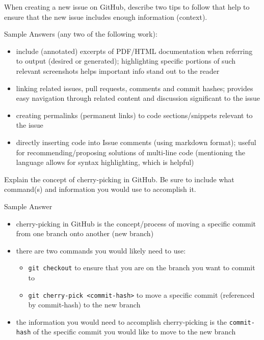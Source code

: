 \documentclass[12pt,fleqn]{examtst}
\begin{document}

\newpage
\noindent
\begin{minipage}{\textwidth}

When creating a new issue on GitHub, describe two tips to follow that help to ensure that the new issue includes enough information (context).


Sample Answers (any two of the following work):
\begin{itemize}
    \item include (annotated) excerpts of PDF/HTML documentation when referring to output (desired or generated); highlighting specific portions of such relevant screenshots helps important info stand out to the reader
    \item linking related issues, pull requests, comments and commit hashes; provides easy navigation through related content and discussion significant to the issue
    \item creating permalinks (permanent links) to code sections/snippets relevant to the issue
    \item directly inserting code into Issue comments (using markdown format); useful for recommending/proposing solutions of multi-line code (mentioning the language allows for syntax highlighting, which is helpful)
\end{itemize}

\rule{0cm}{1cm}

Explain the concept of cherry-picking in GitHub. Be sure to include what command(s) and information you would use to accomplish it.


Sample Answer
\begin{itemize}
    \item cherry-picking in GitHub is the concept/process of moving a specific commit from one branch onto another (new branch)
    \item there are two commands you would likely need to use:
    \begin{itemize}
        \item \lstinline{git checkout} to ensure that you are on the branch you want to commit to
        \item \lstinline{git cherry-pick <commit-hash>} to move a specific commit (referenced by commit-hash) to the new branch
    \end{itemize}
    \item the information you would need to accomplish cherry-picking is the \lstinline{commit-hash} of the specific commit you would like to move to the new branch
\end{itemize}

\end{minipage}
\end{document}
